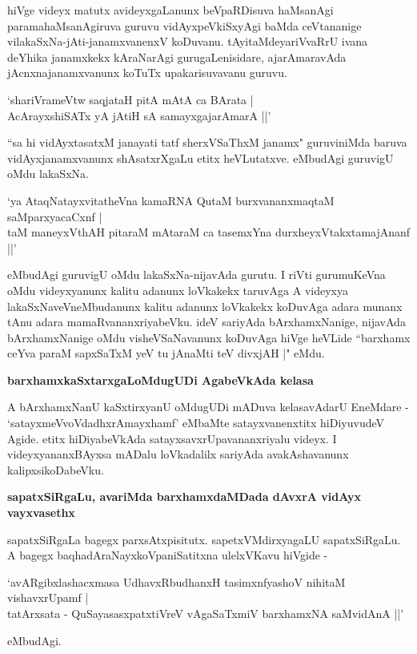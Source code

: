 hiVge videyx matutx avideyxgaLanunx beVpaRDisuva haMsanAgi paramahaMsanAgiruva guruvu vidAyxpeVkiSxyAgi baMda ceVtananige vilakaSxNa-jAti-janamxvanenxV koDuvanu. tAyitaMdeyariVvaRrU ivana deYhika janamxkekx kAraNarAgi gurugaLenisidare, ajarAmaravAda jAcnxnajanamxvanunx koTuTx upakarisuvavanu guruvu.

\begin{shloka}
`shariVrameVtw saqjataH pitA mAtA ca BArata |\\\label{91}
AcArayxshiSATx yA jAtiH sA samayxgajarAmarA ||'
\end{shloka}

``sa hi vidAyxtasatxM janayati tatf sherxVSaThxM janamx"\label{91} guruviniMda baruva vidAyxjanamxvanunx shAsatxrXgaLu etitx heVLutatxve. eMbudAgi guruvigU oMdu lakaSxNa.

\begin{shloka}
`ya AtaqNatayxvitatheVna kamaRNA QutaM burxvananxmaqtaM saMparxyacaCxnf |\\\label{91}
taM maneyxVthAH pitaraM mAtaraM ca tasemxYna durxheyxVtakxtamajAnanf ||'
\end{shloka}

eMbudAgi guruvigU oMdu lakaSxNa-nijavAda gurutu. I riVti gurumuKeVna oMdu videyxyanunx kalitu adanunx loVkakekx taruvAga A videyxya lakaSxNaveVneMbudanunx kalitu adanunx loVkakekx koDuvAga adara munanx tAnu adara mamaRvananxriyabeVku. ideV sariyAda bArxhamxNanige, nijavAda bArxhamxNanige oMdu visheVSaNavanunx koDuvAga hiVge heVLide ``barxhamx ceYva paraM sapxSaTxM\label{92} yeV tu jAnaMti teV divxjAH |" eMdu.

\noindent
\textbf{barxhamxkaSxtarxgaLoMdugUDi AgabeVkAda kelasa}\label{page92}

A bArxhamxNanU kaSxtirxyanU oMdugUDi mADuva kelasavAdarU EneMdare - `satayxmeVvoVdadhxrAmayxhamf'\label{92} eMbaMte satayxvanenxtitx hiDiyuvudeV Agide. etitx hiDiyabeVkAda satayxsavxrUpavananxriyalu videyx. I videyxyananxBAyxsa mADalu loVkadalilx sariyAda avakAshavanunx kalipxsikoDabeVku.

\noindent
\textbf{sapatxSiRgaLu, avariMda barxhamxdaMDada dAvxrA vidAyx vayxvasethx}\label{page92}

sapatxSiRgaLa bagegx parxsAtxpisitutx. sapetxVMdirxyagaLU sapatxSiRgaLu. A bagegx baqhadAraNayxkoVpaniSatitxna ulelxVKavu hiVgide - 

\begin{shloka}
`avARgibxlashacxmasa UdhavxRbudhanxH tasimxnfyashoV nihitaM vishavxrUpamf |\\\label{92}
tatArxsata - QuSayasasxpatxtiVreV vAgaSaTxmiV barxhamxNA saMvidAnA ||'
\end{shloka} 
eMbudAgi.

